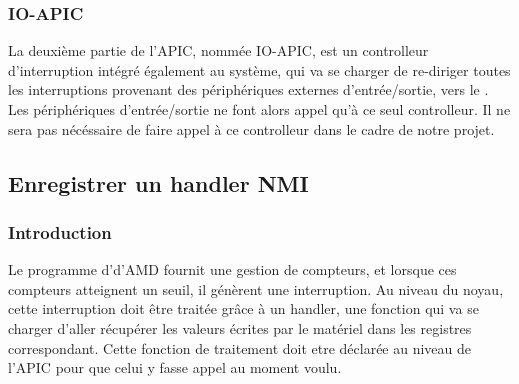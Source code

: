 					\subsubsection{IO-APIC}
						La deuxième partie de l'APIC, nommée IO-APIC, est un controlleur d'interruption intégré également au système, qui va se charger de re-diriger toutes les interruptions provenant des périphériques externes d'entrée/sortie, vers le \lap. Les périphériques d'entrée/sortie ne font alors appel qu'à ce seul controlleur. Il ne sera pas nécéssaire de faire appel à ce controlleur dans le cadre de notre projet.
				\subsection{Enregistrer un handler NMI}
					\subsubsection{Introduction}
						Le programme d'\IBS d'AMD fournit une gestion de compteurs, et lorsque ces compteurs atteignent un seuil, il génèrent une interruption. Au niveau du noyau, cette interruption doit être traitée grâce à un handler, une fonction qui va se charger d'aller récupérer les valeurs écrites par le matériel dans les registres correspondant. Cette fonction de traitement doit etre déclarée au niveau de l'APIC pour que celui y fasse appel au moment voulu.
